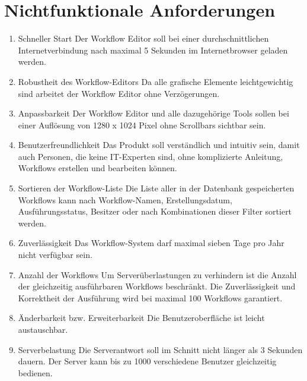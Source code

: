 

\chapter{Nichtfunktionale Anforderungen}
    \begin{enumerate}[font={\bfseries},label={NA\arabic*}0, wide=0pt, labelindent=1em, leftmargin=*]
        
        \item Schneller Start \newline
        Der Workflow Editor soll bei einer durchschnittlichen Internetverbindung nach maximal 5 Sekunden im Internetbrowser geladen werden.
        
        \item Robustheit des Workflow-Editors \newline
        Da alle grafische Elemente leichtgewichtig sind arbeitet der Workflow Editor ohne Verzögerungen.
        
        \item Anpassbarkeit \newline
        Der Workflow Editor und alle dazugehörige Tools sollen bei einer Auflösung von 1280 x 1024 Pixel ohne Scrollbars sichtbar sein.
        
        \item Benutzerfreundlichkeit\newline
        Das Produkt soll verständlich und intuitiv sein, damit auch Personen, die keine IT-Experten sind, ohne komplizierte Anleitung, Workflows erstellen und bearbeiten können.
        
        \item Sortieren der Workflow-Liste\newline
        Die Liste aller in der Datenbank gespeicherten Workflows kann nach Workflow-Namen, Erstellungsdatum, Ausführungsstatus, Besitzer oder nach Kombinationen dieser Filter sortiert werden.
        
        \item Zuverlässigkeit\newline
        Das Workflow-System darf maximal sieben Tage pro Jahr nicht verfügbar sein.
        
        \item Anzahl der Workflows\newline
        Um Serverüberlastungen zu verhindern ist die Anzahl der gleichzeitig ausführbaren Workflows beschränkt. Die Zuverlässigkeit und Korrektheit der Ausführung wird bei maximal 100 Workflows garantiert.
        
        \item Änderbarkeit bzw. Erweiterbarkeit\newline
        Die Benutzeroberfläche ist leicht austauschbar.
        
        \item Serverbelastung\newline
        Die Serverantwort soll im Schnitt nicht länger als 3 Sekunden dauern.
        Der Server kann bis zu 1000 verschiedene Benutzer gleichzeitig bedienen.
        
    \end{enumerate}